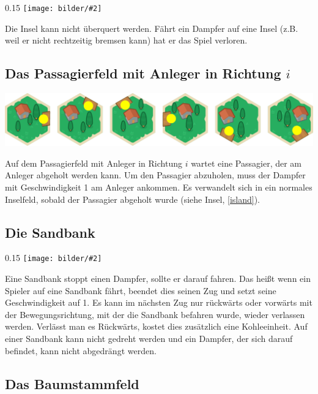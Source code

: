 \documentclass[12pt,a4paper, ngerman, oneside]{scrartcl}
\newcommand{\fieldGraphic}[2]{%
\begin{floatingfigure}[#1]{0.15\textwidth}%
  \centering
  \texttt{[image: bilder/\#2]}%
\end{floatingfigure}%
}
\begin{document}
\fieldGraphic{r}{insel}

Die Insel kann nicht überquert werden. Fährt ein Dampfer auf eine Insel (z.B.
weil er nicht rechtzeitig bremsen kann) hat er das Spiel verloren.

\paragraph{}

\subsection{\label{passenger}Das Passagierfeld mit Anleger in Richtung $i$}

\includegraphics[width=\textwidth]{bilder/passagier}

Auf dem Passagierfeld mit Anleger in Richtung $i$ wartet eine Passagier, der am
Anleger abgeholt werden kann. Um den Passagier abzuholen, muss
der Dampfer mit Geschwindigkeit 1 am Anleger ankommen. Es verwandelt sich in ein normales
Inselfeld, sobald der Passagier abgeholt wurde (siehe Insel, \ref{island}).


\subsection{\label{sandbank}Die Sandbank}

\fieldGraphic{r}{sandbank}

Eine Sandbank stoppt einen Dampfer, sollte er darauf fahren. Das heißt wenn ein
Spieler auf eine Sandbank fährt, beendet dies seinen Zug und setzt seine
Geschwindigkeit auf 1. Es kann im nächsten Zug nur rückwärts oder vorwärts mit
der Bewegungsrichtung, mit der die Sandbank befahren wurde, wieder verlassen werden.
Verlässt man es Rückwärts, kostet dies zusätzlich eine Kohleeinheit. Auf einer
Sandbank kann nicht gedreht werden und ein Dampfer, der sich darauf befindet,
kann nicht abgedrängt werden.

\paragraph{}

\subsection{Das Baumstammfeld}
\end{document}
